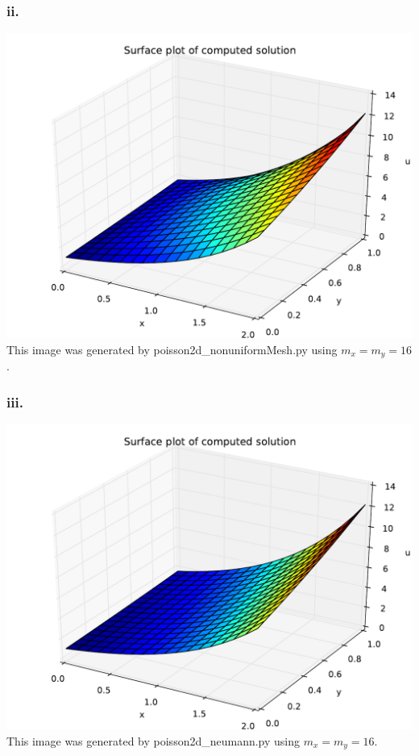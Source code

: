 \documentclass{article}
\begin{document}
\subsubsection*{ii.}
\includegraphics[width=\linewidth]{cii.pdf}
This image was generated by poisson2d\_nonuniformMesh.py using $m_x=m_y=16$.
\subsubsection*{iii.}
\includegraphics[width=\linewidth]{ciii.pdf}
This image was generated by poisson2d\_neumann.py using $m_x=m_y=16$.
\end{document}
